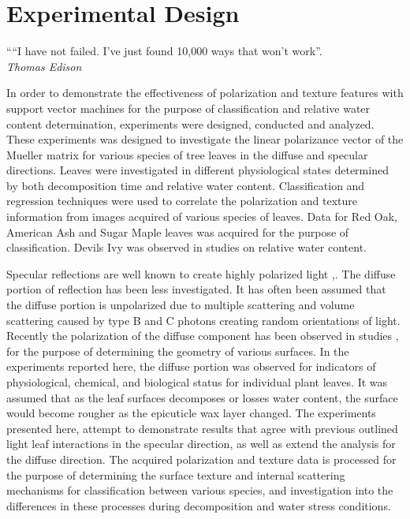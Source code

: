 \chapter{Experimental Design}
\begin{center}
  \begin{minipage}{0.75\textwidth}
    \begin{small}
      ““I have not failed. I've just found 10,000 ways that won't work”.\\
      \null\hfill\emph{Thomas Edison}
    \end{small}
  \end{minipage}
  \vspace{0.5cm}
\end{center}

In order to demonstrate the effectiveness of polarization and texture features with support vector machines for the purpose of classification and relative water content determination, experiments were designed, conducted and analyzed. These experiments was designed to investigate the linear polarizance vector of the Mueller matrix for various species of tree leaves in the diffuse and specular directions.  Leaves were investigated in different physiological states determined by both decomposition time and relative water content.  Classification and regression techniques were used to correlate the polarization and texture information from images acquired of various species of leaves.  Data for Red Oak, American Ash and Sugar Maple leaves was acquired for the purpose of classification.  Devils Ivy was observed in studies on relative water content.

Specular reflections are well known to create highly polarized light \cite{grant},\cite{vanderbilt}. The diffuse portion of reflection has been less investigated.  It has often been assumed that the diffuse portion is unpolarized due to multiple scattering and volume scattering caused by type B and C photons creating random orientations of light.  Recently the polarization of the diffuse component has been observed in studies \cite{surface}, \cite{shapediffuse} for the purpose of determining the geometry of various surfaces.  In the experiments reported here, the diffuse portion was observed for indicators of physiological, chemical, and biological status for individual plant leaves. It was assumed that as the leaf surfaces decomposes or losses water content, the surface would become rougher as the epicuticle wax layer changed. The experiments presented here, attempt to demonstrate results that agree with previous outlined light leaf interactions in the specular direction, as well as extend the analysis for the diffuse direction.  The acquired polarization and texture data is processed for the purpose of determining the surface texture and internal scattering mechanisms for classification between various species, and investigation into the differences in these processes during decomposition and water stress conditions.


